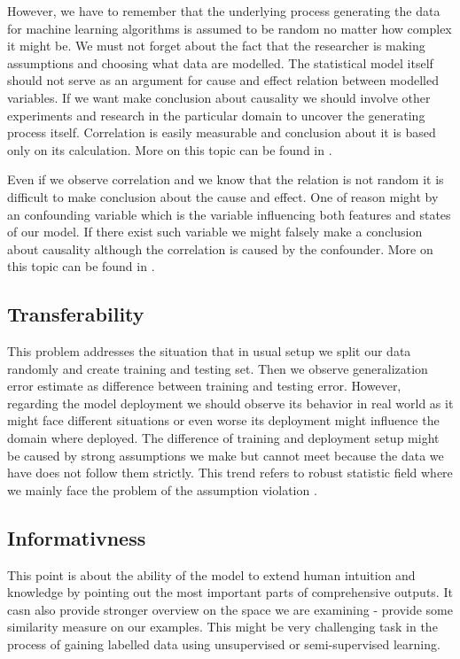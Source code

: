However, we have to remember that the underlying process generating the data for machine learning algorithms is assumed to be random no matter how complex it might be. We must not forget about the fact that the researcher is making assumptions and choosing what data are modelled. The statistical model itself should not serve as an argument for cause and effect relation between modelled variables. If we want make conclusion about causality we should involve other experiments and research in the particular domain to uncover the generating process itself. Correlation is easily measurable and conclusion about it is based only on its calculation. More on this topic can be found in \cite{Kenny1979}.

Even if we observe correlation and we know that the relation is not random it is difficult to make conclusion about the cause and effect. One of reason might by an confounding variable which is the variable influencing both features and states of our model. If there exist such variable we might falsely make a conclusion about causality although the correlation is caused by the confounder. More on this topic can be found in \cite{Skelly2012}.

\subsection{Transferability}
This problem addresses the situation that in usual setup we split our data randomly and create training and testing set. Then we observe generalization error estimate as difference between training and testing error. However, regarding the model deployment we should observe its behavior in real world as it might face different situations or even worse its deployment might influence the domain where deployed. The difference of training and deployment setup might be caused by strong assumptions we make but cannot meet because the data we have does not follow them strictly. This trend refers to robust statistic field where we mainly face the problem of the assumption violation \cite{Erceg-Hurn2008}.

\subsection{Informativness}
This point is about the ability of the model to extend human intuition and knowledge by pointing out the most important parts of comprehensive outputs. It casn also provide stronger overview on the space we are examining - provide some similarity measure on our examples. This might be very challenging task in the process of gaining labelled data using unsupervised or semi-supervised learning.

